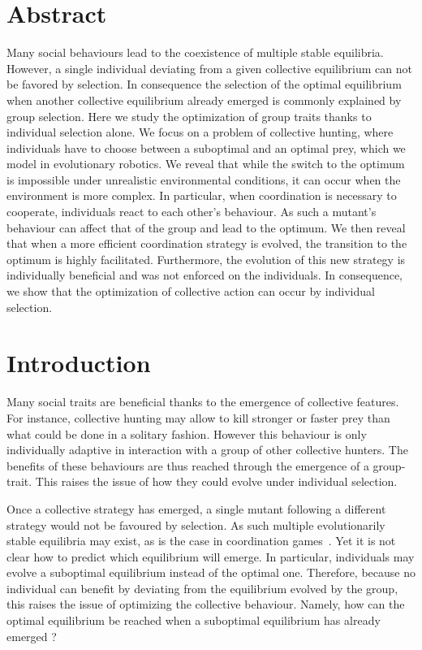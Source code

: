 \section{Abstract}
  Many social behaviours lead to the coexistence of multiple stable equilibria. However, a single individual deviating from a given collective equilibrium can not be favored by selection. In consequence the selection of the optimal equilibrium when another collective equilibrium already emerged is commonly explained by group selection. Here we study the optimization of group traits thanks to individual selection alone. We focus on a problem of collective hunting, where individuals have to choose between a suboptimal and an optimal prey, which we model in evolutionary robotics. We reveal that while the switch to the optimum is impossible under unrealistic environmental conditions, it can occur when the environment is more complex. In particular, when coordination is necessary to cooperate, individuals react to each other's behaviour. As such a mutant's behaviour can affect that of the group and lead to the optimum. We then reveal that when a more efficient coordination strategy is evolved, the transition to the optimum is highly facilitated. Furthermore, the evolution of this new strategy is individually beneficial and was not enforced on the individuals. In consequence, we show that  the optimization of collective action can occur by individual selection.


\section{Introduction}
  Many social traits are beneficial thanks to the emergence of collective features. For instance, collective hunting may allow to kill stronger or faster prey than what could be done in a solitary fashion. However this behaviour is only individually adaptive in interaction with a group of other collective hunters. The benefits of these behaviours are thus reached through the emergence of a group-trait. This raises the issue of how they could evolve under individual selection.

  Once a collective strategy has emerged, a single mutant following a different strategy would not be favoured by selection. As such multiple evolutionarily stable equilibria may exist, as is the case in coordination games~\parencite{MaynardSmith1982a, Skyrms2004}. Yet it is not clear how to predict which equilibrium will emerge. In particular, individuals may evolve a suboptimal equilibrium instead of the optimal one. Therefore, because no individual can benefit by deviating from the equilibrium evolved by the group, this raises the issue of optimizing the collective behaviour. Namely, how can the optimal equilibrium be reached when a suboptimal equilibrium has already emerged ?

